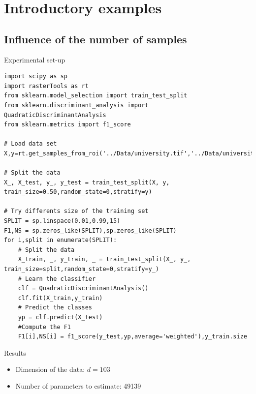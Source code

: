 \documentclass[10pt,aspectratio=1610]{beamer}
\begin{document}
\section{Introductory examples}
\label{sec:org0899025}
\subsection{Influence of the number of samples}
\label{sec:org2e211c1}
\begin{frame}[fragile,label={sec:orgbe81852}]{Experimental set-up}
 \begin{verbatim}
import scipy as sp
import rasterTools as rt
from sklearn.model_selection import train_test_split
from sklearn.discriminant_analysis import QuadraticDiscriminantAnalysis
from sklearn.metrics import f1_score

# Load data set
X,y=rt.get_samples_from_roi('../Data/university.tif','../Data/university_gt.tif')

# Split the data
X_, X_test, y_, y_test = train_test_split(X, y, train_size=0.50,random_state=0,stratify=y)

# Try differents size of the training set
SPLIT = sp.linspace(0.01,0.99,15)
F1,NS = sp.zeros_like(SPLIT),sp.zeros_like(SPLIT)
for i,split in enumerate(SPLIT):
    # Split the data
    X_train, _, y_train, _ = train_test_split(X_, y_, train_size=split,random_state=0,stratify=y_)
    # Learn the classifier
    clf = QuadraticDiscriminantAnalysis()
    clf.fit(X_train,y_train)
    # Predict the classes
    yp = clf.predict(X_test)
    #Compute the F1
    F1[i],NS[i] = f1_score(y_test,yp,average='weighted'),y_train.size
\end{verbatim}
\end{frame}

\begin{frame}[label={sec:org8b796c1}]{Results}
\begin{center}
\end{center}

\begin{itemize}
\item Dimension of the data: \(d=103\)
\item Number of parameters to estimate: 49139
\end{itemize}
\end{frame}
\end{document}
